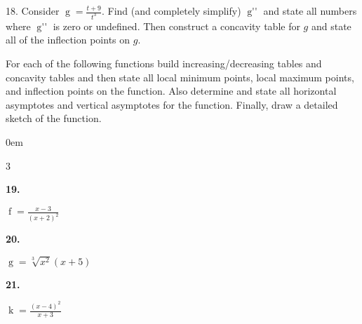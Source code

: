 \documentclass[12pt,]{book}
\theoremstyle{plain}
\theoremstyle{definition}
\numberwithin{equation}{section}
\newenvironment{exercisegroup}%
{\medskip\noindent}%
{\par\bigskip}%
\newlength{\exercisegroupindent}%
\newlength{\exercisegroupitemwidth}%
\newenvironment{exercisegrouplist}%
{\vspace{-\partopsep}%
\begin{adjustwidth}{\exercisegroupindent}{0em}}%
{\end{adjustwidth}%
\vspace{-\partopsep}%
\vspace{\baselineskip}}%
\newenvironment{exercisegroupbycol}[1]%
{\begin{exercisegrouplist}%
\vspace{-\multicolsep}%
\begin{multicols}{#1}%
\setlength{\parindent}{0em}%
\setlength{\exercisegroupitemwidth}{\linewidth}}%
{\end{multicols}%
\vspace{-\multicolsep}%
\end{exercisegrouplist}}%
\newenvironment{exercisegroupitem}[1]%
{\begin{minipage}[t]{\exercisegroupitemwidth}
\vspace{0pt}%
{\bfseries#1}%
\rule{0pt}{\baselineskip}}{\strut%
\end{minipage}%
\hspace{\columnsep}}%
\providecommand\phantomsection{}
\newcommand{\fe}[2]{\mathop{{#1}{\left(#2\right)}}}
\newcommand{\sd}[1]{#1''}
\begin{document}
\begin{exerciselist}
\item[18.]\phantomsection\hypertarget{exercise-87}{\null}Consider \(\fe{g}{t}=\frac{t+9}{t^3}\).  Find (and completely simplify) \(\fe{\sd{g}}{t}\) and state all numbers where \(\fe{\sd{g}}{t}\) is zero or undefined.  Then construct a concavity table for \(g\) and state all of the inflection points on \(g\).%
\par\smallskip
\end{exerciselist}
\begin{exercisegroup}%
For each of the following functions build increasing/decreasing tables and concavity tables and then state all local minimum points, local maximum points, and inflection points on the function.  Also determine and state all horizontal asymptotes and vertical asymptotes for the function.   Finally, draw a detailed sketch of the function.%
\par
\begin{exercisegroupbycol}{3}%
\begin{exercisegroupitem}{19. }\phantomsection\hypertarget{exercise-88}{\null}
\(\fe{f}{x}=\frac{x-3}{(x+2)^2}\)%
\end{exercisegroupitem}%
\par%
\begin{exercisegroupitem}{20. }\phantomsection\hypertarget{exercise-89}{\null}
\(\fe{g}{x}=\sqrt[3]{x^2}(x+5)\)%
\end{exercisegroupitem}%
\par%
\begin{exercisegroupitem}{21. }\phantomsection\hypertarget{exercise-90}{\null}
\(\fe{k}{x}=\frac{(x-4)^2}{x+3}\)%
\end{exercisegroupitem}%
\par%
\end{exercisegroupbycol}%
\end{exercisegroup}%
%
\backmatter
%
\typeout{************************************************}
\typeout{************************************************}
\end{document}
